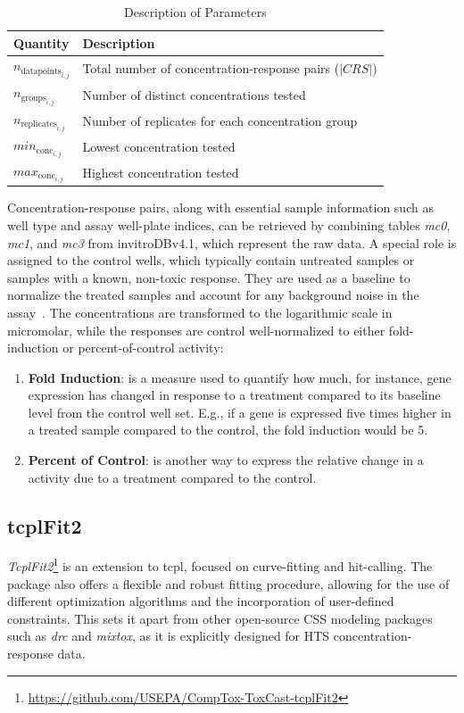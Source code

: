 \begin{table}
    \centering
    \caption{Description of Parameters}
    \label{tab:concentrations_quantities}
    \begin{tabular}{ll}
        \toprule
        \textbf{Quantity} & \textbf{Description} \\
        \midrule
        $n_{\text{datapoints}_{i,j}}$ & Total number of concentration-response pairs ($|CRS|$) \\
        $n_{\text{groups}_{i,j}}$ & Number of distinct concentrations tested \\
        $n_{\text{replicates}_{i,j}}$ & Number of replicates for each concentration group \\
        $min_{\text{conc}_{i,j}}$ & Lowest concentration tested \\
        $max_{\text{conc}_{i,j}}$ & Highest concentration tested \\
        \bottomrule
    \end{tabular}
\end{table}

Concentration-response pairs, along with essential sample information such as well type and assay well-plate indices, can be retrieved by combining tables \emph{mc0}, \emph{mc1}, and \emph{mc3} from invitroDBv4.1, which represent the raw data. A special role is assigned to the control wells, which typically contain untreated samples or samples with a known, non-toxic response. They are used as a baseline to normalize the treated samples and account for any background noise in the assay~\cite{sheffield2021}. The concentrations are transformed to the logarithmic scale in micromolar, while the responses are control well-normalized to either fold-induction or percent-of-control activity:

\begin{enumerate}
    \item \textbf{Fold Induction}: is a measure used to quantify how much, for instance, gene expression has changed in response to a treatment compared to its baseline level from the control well set. E.g., if a gene is expressed five times higher in a treated sample compared to the control, the fold induction would be 5.
    \item \textbf{Percent of Control}: is another way to express the relative change in a activity due to a treatment compared to the control.
\end{enumerate}


\subsection{tcplFit2}\label{sec:tcplfit2}
\emph{TcplFit2}\footnote{\url{https://github.com/USEPA/CompTox-ToxCast-tcplFit2}} is an extension to tcpl, focused on curve-fitting and hit-calling. The package also offers a flexible and robust fitting procedure, allowing for the use of different optimization algorithms and the incorporation of user-defined constraints. This sets it apart from other open-source CSS modeling packages such as \emph{drc} and \emph{mixtox}, as it is explicitly designed for HTS concentration-response data.

